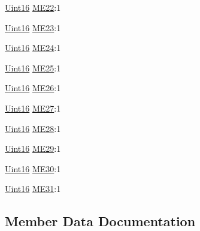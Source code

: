 \begin{DoxyCompactItemize}
\item 
\hyperlink{_d_s_p2833x___device_8h_a59a9f6be4562c327cbfb4f7e8e18f08b}{Uint16} \hyperlink{struct_c_a_n_m_e___b_i_t_s_afaec6534c19953fa78b39fb67fcf7e3f}{M\+E22}\+:1
\item 
\hyperlink{_d_s_p2833x___device_8h_a59a9f6be4562c327cbfb4f7e8e18f08b}{Uint16} \hyperlink{struct_c_a_n_m_e___b_i_t_s_ab84b923314cbc28b7b94d1240490c26c}{M\+E23}\+:1
\item 
\hyperlink{_d_s_p2833x___device_8h_a59a9f6be4562c327cbfb4f7e8e18f08b}{Uint16} \hyperlink{struct_c_a_n_m_e___b_i_t_s_ab1e8ad4e82824d7667826cae8b90e059}{M\+E24}\+:1
\item 
\hyperlink{_d_s_p2833x___device_8h_a59a9f6be4562c327cbfb4f7e8e18f08b}{Uint16} \hyperlink{struct_c_a_n_m_e___b_i_t_s_a3fbb1fe33dbd5ea792a904ad46c6560d}{M\+E25}\+:1
\item 
\hyperlink{_d_s_p2833x___device_8h_a59a9f6be4562c327cbfb4f7e8e18f08b}{Uint16} \hyperlink{struct_c_a_n_m_e___b_i_t_s_ad79a8c61aa4422987b9efa3048003961}{M\+E26}\+:1
\item 
\hyperlink{_d_s_p2833x___device_8h_a59a9f6be4562c327cbfb4f7e8e18f08b}{Uint16} \hyperlink{struct_c_a_n_m_e___b_i_t_s_a5f40c881a31b4ff26748ff27e0fcfaac}{M\+E27}\+:1
\item 
\hyperlink{_d_s_p2833x___device_8h_a59a9f6be4562c327cbfb4f7e8e18f08b}{Uint16} \hyperlink{struct_c_a_n_m_e___b_i_t_s_a31e4f633b13948667d7335544badc26f}{M\+E28}\+:1
\item 
\hyperlink{_d_s_p2833x___device_8h_a59a9f6be4562c327cbfb4f7e8e18f08b}{Uint16} \hyperlink{struct_c_a_n_m_e___b_i_t_s_a35687fbf930d07668dd37aea0ec46896}{M\+E29}\+:1
\item 
\hyperlink{_d_s_p2833x___device_8h_a59a9f6be4562c327cbfb4f7e8e18f08b}{Uint16} \hyperlink{struct_c_a_n_m_e___b_i_t_s_acfab7fa2c94a88cf8c9ec07888346175}{M\+E30}\+:1
\item 
\hyperlink{_d_s_p2833x___device_8h_a59a9f6be4562c327cbfb4f7e8e18f08b}{Uint16} \hyperlink{struct_c_a_n_m_e___b_i_t_s_a01c66013f7519b8d9eb5ae5ec007b7bf}{M\+E31}\+:1
\end{DoxyCompactItemize}


\subsection{Member Data Documentation}
\hypertarget{struct_c_a_n_m_e___b_i_t_s_a92911d210693a251b4249be974ada8c4}{}
